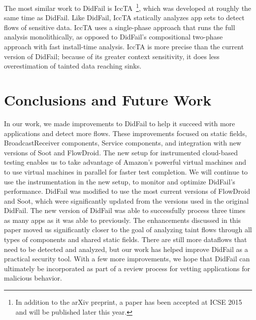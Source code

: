 The most similar work to DidFail is IccTA~\cite{li2014know}\footnote{In addition to the arXiv preprint, a paper has been accepted at ICSE 2015 and will be published later this year.}, which was developed at roughly the same time as DidFail.  Like DidFail, IccTA statically analyzes app sets to detect flows of sensitive data. IccTA uses a single-phase approach that runs the full analysis monolithically, as opposed to DidFail's compositional two-phase approach with fast install-time analysis. IccTA is more precise than the current version of DidFail; because of its greater context sensitivity, it does less overestimation of tainted data reaching sinks.

\chapter{Conclusions and Future Work}
In our work, we made improvements to DidFail to help it succeed with more applications and detect more flows. 
These improvements focused on static fields, BroadcastReceiver components, Service components, and integration with new versions of Soot and FlowDroid.
 The new setup for instrumented cloud-based testing enables us to take advantage of Amazon's powerful virtual machines and to use virtual machines in parallel for faster test completion. We will continue to use the instrumentation in the new setup, to monitor and optimize DidFail's performance. DidFail was modified to use the most current versions of FlowDroid and Soot, which were significantly updated from the versions used in the original DidFail. The new version of DidFail was able to successfully process three times as many apps as it was able to previously. The enhancements discussed in this paper moved us significantly closer to the goal of analyzing taint flows through all types of components and shared static fields.
There are still more dataflows that need to be detected and analyzed, but our work has helped improve DidFail as a practical security tool. 
 With a few more improvements, we hope that DidFail can ultimately be incorporated as part of a review process for vetting applications for malicious behavior. 




%




